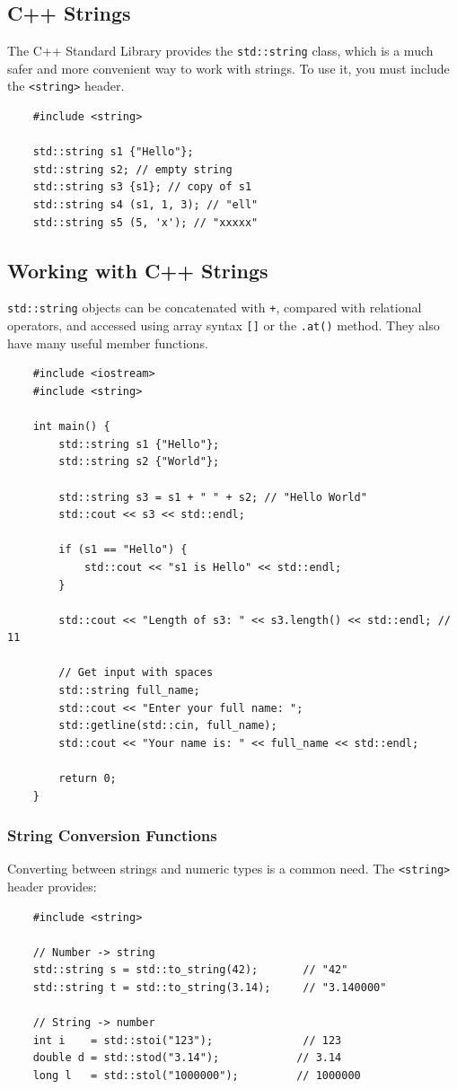\subsection{C++ Strings}
The C++ Standard Library provides the \texttt{std::string} class, which is a much safer and more convenient way to work with strings. To use it, you must include the \texttt{<string>} header.

\begin{lstlisting}
	#include <string>

	std::string s1 {"Hello"};
	std::string s2; // empty string
	std::string s3 {s1}; // copy of s1
	std::string s4 (s1, 1, 3); // "ell"
	std::string s5 (5, 'x'); // "xxxxx"
\end{lstlisting}

\subsection{Working with C++ Strings}
\texttt{std::string} objects can be concatenated with \texttt{+}, compared with relational operators, and accessed using array syntax \texttt{[]} or the \texttt{.at()} method. They also have many useful member functions.

\begin{lstlisting}
	#include <iostream>
	#include <string>

	int main() {
		std::string s1 {"Hello"};
		std::string s2 {"World"};

		std::string s3 = s1 + " " + s2; // "Hello World"
		std::cout << s3 << std::endl;

		if (s1 == "Hello") {
			std::cout << "s1 is Hello" << std::endl;
		}

		std::cout << "Length of s3: " << s3.length() << std::endl; // 11

		// Get input with spaces
		std::string full_name;
		std::cout << "Enter your full name: ";
		std::getline(std::cin, full_name);
		std::cout << "Your name is: " << full_name << std::endl;

		return 0;
	}
\end{lstlisting}

\subsubsection{String Conversion Functions}

Converting between strings and numeric types is a common need. The \texttt{<string>} header provides:

\begin{lstlisting}
	#include <string>

	// Number -> string
	std::string s = std::to_string(42);       // "42"
	std::string t = std::to_string(3.14);     // "3.140000"

	// String -> number
	int i    = std::stoi("123");              // 123
	double d = std::stod("3.14");            // 3.14
	long l   = std::stol("1000000");         // 1000000
\end{lstlisting}

